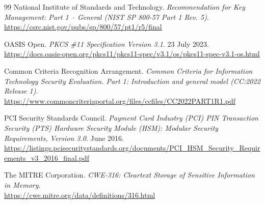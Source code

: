 \documentclass[12pt,a4paper]{article}
\begin{document}
\begin{thebibliography}{99}
    National Institute of Standards and Technology.
    \textit{Recommendation for Key Management: Part 1 -- General (NIST SP 800-57 Part 1 Rev. 5)}.
    \\
    \url{https://csrc.nist.gov/pubs/sp/800/57/pt1/r5/final}

    OASIS Open.
    \textit{PKCS \#11 Specification Version 3.1}. 23 July 2023.
    \\
    \url{https://docs.oasis-open.org/pkcs11/pkcs11-spec/v3.1/os/pkcs11-spec-v3.1-os.html}

    Common Criteria Recognition Arrangement.
    \textit{Common Criteria for Information Technology Security Evaluation. Part 1: Introduction and general model (CC:2022 Release 1)}.
    \\
    \url{https://www.commoncriteriaportal.org/files/ccfiles/CC2022PART1R1.pdf}

    PCI Security Standards Council.
    \textit{Payment Card Industry (PCI) PIN Transaction Security (PTS) Hardware Security Module (HSM): Modular Security Requirements, Version 3.0}. June 2016.
    \\
    \url{https://listings.pcisecuritystandards.org/documents/PCI_HSM_Security_Requirements_v3_2016_final.pdf}

    The MITRE Corporation.
    \textit{CWE-316: Cleartext Storage of Sensitive Information in Memory}.
    \\
    \url{https://cwe.mitre.org/data/definitions/316.html}

\end{thebibliography}
\end{document}
